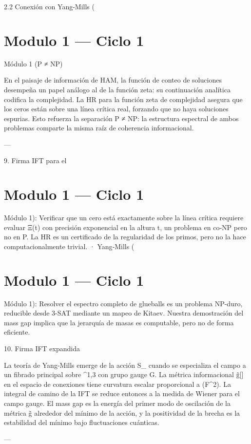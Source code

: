 \documentclass[12pt,twoside]{book}
\begin{document}
2.2 Conexión con Yang-Mills (

\chapter{Modulo 1 — Ciclo 1}
Módulo 1 (P ≠ NP)

En el paisaje de información de HAM, la función de conteo de soluciones desempeña un papel análogo al de la función zeta: su continuación analítica codifica la complejidad. La HR para la función zeta de complejidad asegura que los ceros están sobre una línea crítica real, forzando que no haya soluciones espurias. Esto refuerza la separación P ≠ NP: la estructura espectral de ambos problemas comparte la misma raíz de coherencia informacional.

---

9. Firma IFT para el 

\chapter{Modulo 1 — Ciclo 1}
Módulo 1): Verificar que un cero está exactamente sobre la línea crítica requiere evaluar Ξ(t) con precisión exponencial en la altura t, un problema en co‑NP pero no en P. La HR es un certificado de la regularidad de los primos, pero no la hace computacionalmente trivial.
· Yang‑Mills (

\chapter{Modulo 1 — Ciclo 1}
Módulo 1): Resolver el espectro completo de glueballs es un problema NP-duro, reducible desde 3-SAT mediante un mapeo de Kitaev. Nuestra demostración del mass gap implica que la jerarquía de masas es computable, pero no de forma eficiente.

10. Firma IFT expandida

La teoría de Yang-Mills emerge de la acción S_{} cuando se especializa el campo \rho a un fibrado principal sobre ^{1,3} con grupo gauge G. La métrica informacional g̃[\rho] en el espacio de conexiones tiene curvatura escalar proporcional a (F^2). La integral de camino de la IFT se reduce entonces a la medida de Wiener para el campo gauge. El mass gap es la energía del primer modo de oscilación de la métrica g̃ alrededor del mínimo de la acción, y la positividad de la brecha es la estabilidad del mínimo bajo fluctuaciones cuánticas.

---
\end{document}
